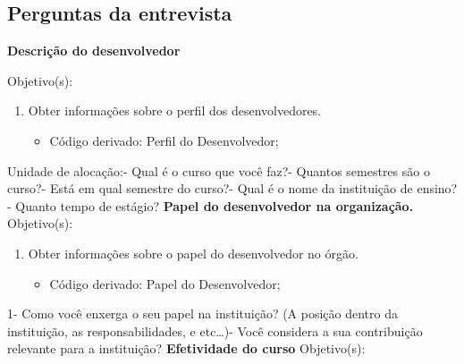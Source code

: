 \begin{anexosenv}

\partanexos

\chapter{Perguntas da entrevista}

\begin{flushleft}
\textbf{Descrição do desenvolvedor}
\end{flushleft}
Objetivo(s):
\begin{enumerate}
\item Obter informações sobre o perfil dos desenvolvedores.
\begin{itemize}
\item Código derivado: Perfil do Desenvolvedor;
\end{itemize}
\end{enumerate}
Unidade de alocação:\newline{}- Qual é o curso que você faz?- Quantos semestres são o curso?- Está em qual semestre do curso?- Qual é o nome da instituição de ensino?- Quanto tempo de estágio?\newline
\newline
\textbf{Papel do desenvolvedor na organização.}\newline\newline
Objetivo(s):
\begin{enumerate}
\item Obter informações sobre o papel do desenvolvedor no órgão.
\begin{itemize}
\item Código derivado: Papel do Desenvolvedor;
\end{itemize}
\end{enumerate}
1- Como você enxerga o seu papel na instituição? (A posição dentro da instituição, as responsabilidades, e etc…)- Você considera a sua contribuição relevante para a instituição?\newline
    \newline
\textbf{Efetividade do curso}\newline\newline
Objetivo(s):

\end{anexosenv}
